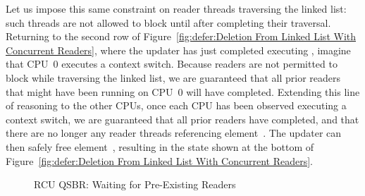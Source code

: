 Let us impose this same constraint on reader threads traversing the
linked list: such threads are not allowed to block until after
completing their traversal.
Returning to the second row of
Figure~\ref{fig:defer:Deletion From Linked List With Concurrent Readers},
where the updater has just completed executing ,
imagine that CPU~0 executes a context switch.
Because readers are not permitted to block while traversing the linked
list, we are guaranteed that all prior readers that might have been running on
CPU~0 will have completed.
Extending this line of reasoning to the other CPUs, once each CPU has
been observed executing a context switch, we are guaranteed that all
prior readers have completed, and that there are no longer any reader
threads referencing element~.
The updater can then safely free element~, resulting in the
state shown at the bottom of
Figure~\ref{fig:defer:Deletion From Linked List With Concurrent Readers}.
\fi

\begin{figure}[tb]
\centering
{}
\caption{RCU QSBR: Waiting for Pre-Existing Readers}
\label{fig:defer:RCU QSBR: Waiting for Pre-Existing Readers}
\end{figure}


